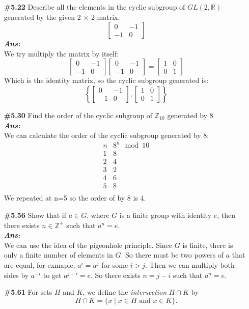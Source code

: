 \documentclass[12pt]{article}
\newcommand{\sol}{\setlength{\parindent}{0cm}\textbf{\textit{Ans:}}\setlength{\parindent}{1cm} }
\begin{document}
\begin{enumerate}[start=1,label={\bfseries Question \arabic*:},leftmargin=1in]
  \item[\textbf{\#5.22}] Describe all the elements in the cyclic subgroup of $GL(2, \mathbb{R})$ generated by the given 2 $\times$ 2 matrix.
  \[
  \begin{bmatrix}
  0 & -1 \\
  -1 & 0
  \end{bmatrix}
  \]
  \sol{}\\
  We try multiply the matrix by itself:
  \[
  \begin{bmatrix}
  0 & -1 \\
  -1 & 0
  \end{bmatrix}
  \begin{bmatrix}
  0 & -1 \\
  -1 & 0
  \end{bmatrix}
  =
  \begin{bmatrix}
  1 & 0 \\
  0 & 1
  \end{bmatrix}
  \]
  Which is the identity matrix, so the cyclic subgroup generated is:
  \[
  \left\{
  \begin{bmatrix}
  0 & -1 \\
  -1 & 0
  \end{bmatrix},
  \begin{bmatrix}
  1 & 0 \\
  0 & 1
  \end{bmatrix}
  \right\}
  \]
  \item[\textbf{\#5.30}]
  Find the order of the cyclic subgroup of $\mathbb{Z}_{10}$ generated by 8\\
  \sol{}\\
  We can calculate the order of the cyclic subgroup generated by 8:\\
  \[
  \begin{array}{c|c}
  n & 8^n \mod 10 \\
  \hline
  1 & 8 \\
  2 & 4 \\
  3 & 2 \\
  4 & 6 \\
  5 & 8 \\
  \end{array}
  \]
  We repeated at n=5 so the order of by 8 is 4.
  \item[\textbf{\#5.56}] Show that if $a \in G$, where $G$ is a finite group with identity $e$, 
  then there exists $n \in \mathbb{Z}^+$ such that $a^n = e$.\\
  \sol{}\\
  We can use the idea of the pigeonhole principle. Since $G$ is finite, there is only a finite number of elements in $G$.
  So there must be two powers of $a$ that are equal, for exmaple, $a^i = a^j$ for some $i > j$.
  Then we can multiply both sides by $a^{-i}$ to get $a^{j-i} = e$. So there exists $n = j-i$ such that $a^n = e$.
  \item[\textbf{\#5.61}] For sets $H$ and $K$, we define the \textit{intersection} $H \cap K$ by
  \[
  H \cap K = \{x \mid x \in H \text{ and } x \in K\}.
  \]
  

\end{enumerate}
\end{document}
